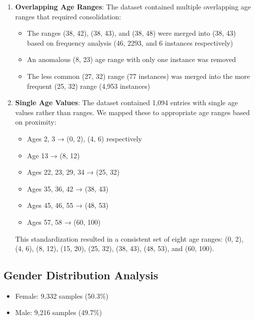 \documentclass{article}
\begin{document}
\begin{enumerate}
    \item \textbf{Overlapping Age Ranges}: The dataset contained multiple overlapping age ranges that required consolidation:
    \begin{itemize}
        \item The ranges (38, 42), (38, 43), and (38, 48) were merged into (38, 43) based on frequency analysis (46, 2293, and 6 instances respectively)
        \item An anomalous (8, 23) age range with only one instance was removed
        \item The less common (27, 32) range (77 instances) was merged into the more frequent (25, 32) range (4,953 instances)
    \end{itemize}
    
    \item \textbf{Single Age Values}: The dataset contained 1,094 entries with single age values rather than ranges. We mapped these to appropriate age ranges based on proximity:
    \begin{itemize}
        \item Ages 2, 3 → (0, 2), (4, 6) respectively
        \item Age 13 → (8, 12)
        \item Ages 22, 23, 29, 34 → (25, 32)
        \item Ages 35, 36, 42 → (38, 43)
        \item Ages 45, 46, 55 → (48, 53)
        \item Ages 57, 58 → (60, 100)
    \end{itemize}
    
    This standardization resulted in a consistent set of eight age ranges: (0, 2), (4, 6), (8, 12), (15, 20), (25, 32), (38, 43), (48, 53), and (60, 100).
\end{enumerate}

\subsection{Gender Distribution Analysis}


\begin{itemize}
    \item Female: 9,332 samples (50.3\%)
    \item Male: 9,216 samples (49.7\%)
\end{itemize}
\end{document}
